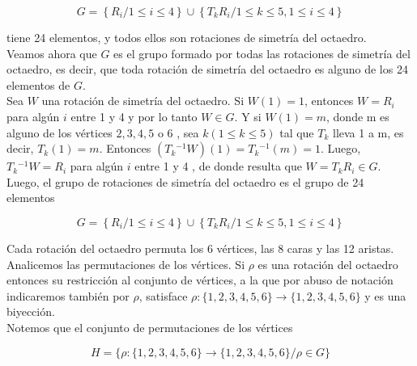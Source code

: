 \documentclass[10pt]{article}
\begin{document}
$$
G=\left\{R_{i} / 1 \leq i \leq 4\right\} \cup\left\{T_{k} R_{i} / 1 \leq k \leq 5,1 \leq i \leq 4\right\}
$$

tiene 24 elementos, y todos ellos son rotaciones de simetría del octaedro.\\
Veamos ahora que $G$ es el grupo formado por todas las rotaciones de simetría del octaedro, es decir, que toda rotación de simetría del octaedro es alguno de los 24 elementos de $G$.\\
Sea $W$ una rotación de simetría del octaedro. Si $W(1)=1$, entonces $W=R_{i}$ para algún $i$ entre 1 y 4 y por lo tanto $W \in G$. Y si $W(1)=m$, donde m es alguno de los vértices $2,3,4,5$ o 6 , sea $k(1 \leq k \leq 5)$ tal que $T_{k}$ lleva 1 a m, es decir, $T_{k}(1)=m$. Entonces $\left(T_{k}{ }^{-1} W\right)(1)=T_{k}{ }^{-1}(m)=1$. Luego, $T_{k}{ }^{-1} W=R_{i}$ para algún $i$ entre 1 y 4 , de donde resulta que $W=T_{k} R_{i} \in G$.\\
Luego, el grupo de rotaciones de simetría del octaedro es el grupo de 24 elementos

$$
G=\left\{R_{i} / 1 \leq i \leq 4\right\} \cup\left\{T_{k} R_{i} / 1 \leq k \leq 5,1 \leq i \leq 4\right\}
$$

Cada rotación del octaedro permuta los 6 vértices, las 8 caras y las 12 aristas. Analicemos las permutaciones de los vértices. Si $\rho$ es una rotación del octaedro entonces su restricción al conjunto de vértices, a la que por abuso de notación indicaremos también por $\rho$, satisface $\rho:\{1,2,3,4,5,6\} \longrightarrow\{1,2,3,4,5,6\}$ y es una biyección.\\
Notemos que el conjunto de permutaciones de los vértices

$$
H=\{\rho:\{1,2,3,4,5,6\} \longrightarrow\{1,2,3,4,5,6\} / \rho \in G\}
$$
\end{document}
